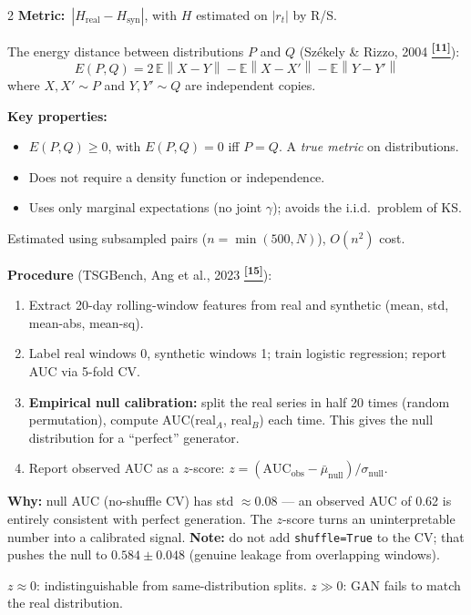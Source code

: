 \documentclass[10pt]{article}
\newcommand{\skybox}[2]{\begin{tcolorbox}[mybox={Sky}{BBg},title={#1}]#2\end{tcolorbox}}
\newcommand{\tealbox}[2]{\begin{tcolorbox}[mybox={Teal}{LBg},title={#1}]#2\end{tcolorbox}}
\newcommand{\tcite}[1]{%
  \hyperlink{R:#1}{\textsuperscript{\scriptsize\textbf{[#1]}}}}
\newcommand{\E}{\mathbb{E}}
\newcommand{\norm}[1]{\left\|#1\right\|}
\begin{document}
\begin{multicols}{2}
{\textbf{Metric:}\ $|H_\text{real} - H_\text{syn}|$, with $H$ estimated on $|r_t|$ by R/S.}

\columnbreak

\skybox{3.\ Energy Distance --- A Proper Distributional Metric}{%
The energy distance between distributions $P$ and $Q$ (Sz\'{e}kely \& Rizzo, 2004\tcite{11}):
\begin{equation*}
  E(P,Q) = 2\,\E\norm{X - Y} - \E\norm{X - X'} - \E\norm{Y - Y'}
\end{equation*}
where $X, X' \sim P$ and $Y, Y' \sim Q$ are independent copies.

\textbf{Key properties:}
\begin{itemize}
  \item $E(P,Q) \geq 0$, with $E(P,Q) = 0$ iff $P = Q$. A \emph{true metric} on distributions.
  \item Does not require a density function or independence.
  \item Uses only marginal expectations (no joint $\gamma$); avoids the i.i.d.\ problem of KS.
\end{itemize}
Estimated using subsampled pairs ($n = \min(500, N)$), $O(n^2)$ cost.}

\tealbox{4.\ Discriminative AUC --- Calibrated Against Empirical Null}{%
\textbf{Procedure} (TSGBench, Ang et al., 2023\tcite{15}):
\begin{enumerate}
  \item Extract 20-day rolling-window features from real and synthetic (mean, std, mean-abs, mean-sq).
  \item Label real windows 0, synthetic windows 1; train logistic regression; report AUC via 5-fold CV.
  \item \textbf{Empirical null calibration:} split the real series in half 20 times (random permutation), compute AUC(real$_A$, real$_B$) each time. This gives the null distribution for a ``perfect'' generator.
  \item Report observed AUC as a $z$-score: $z = (\text{AUC}_\text{obs} - \bar{\mu}_\text{null}) / \sigma_\text{null}$.
\end{enumerate}
\textbf{Why:} null AUC (no-shuffle CV) has std $\approx 0.08$ --- an observed AUC of 0.62 is entirely consistent with perfect generation. The $z$-score turns an uninterpretable number into a calibrated signal. \textbf{Note:} do not add \texttt{shuffle=True} to the CV; that pushes the null to $0.584 \pm 0.048$ (genuine leakage from overlapping windows).

$z \approx 0$: indistinguishable from same-distribution splits. $z \gg 0$: GAN fails to match the real distribution.}


\end{multicols}
\end{document}
